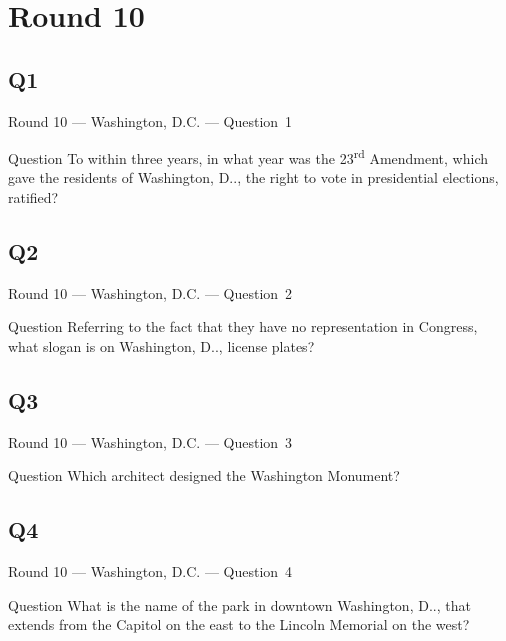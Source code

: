 \documentclass[11pt]{beamer}
\begin{document}
\section{Round 10}
\subsection*{Q1}
\begin{frame}[t]{Round 10 --- Washington, D.C. --- \mbox{Question 1}}
    \vspace{-0.5em}
    \begin{block}{Question}
        To within three years, in what year was the 23\textsuperscript{rd} Amendment, which gave the residents of Washington, D.\@C.\@, the right to vote in presidential elections, ratified?
    \end{block}
\end{frame}
\subsection*{Q2}
\begin{frame}[t]{Round 10 --- Washington, D.C. --- \mbox{Question 2}}
    \vspace{-0.5em}
    \begin{block}{Question}
        Referring to the fact that they have no representation in Congress, what slogan is on Washington, D.\@C.\@, license plates?
    \end{block}
\end{frame}
\subsection*{Q3}
\begin{frame}[t]{Round 10 --- Washington, D.C. --- \mbox{Question 3}}
    \vspace{-0.5em}
    \begin{block}{Question}
        Which architect designed the Washington Monument?
    \end{block}
\end{frame}
\subsection*{Q4}
\begin{frame}[t]{Round 10 --- Washington, D.C. --- \mbox{Question 4}}
    \vspace{-0.5em}
    \begin{block}{Question}
        What is the name of the park in downtown Washington, D.\@C.\@, that extends from the Capitol on the east to the Lincoln Memorial on the west?
    \end{block}
\end{frame}
\end{document}
